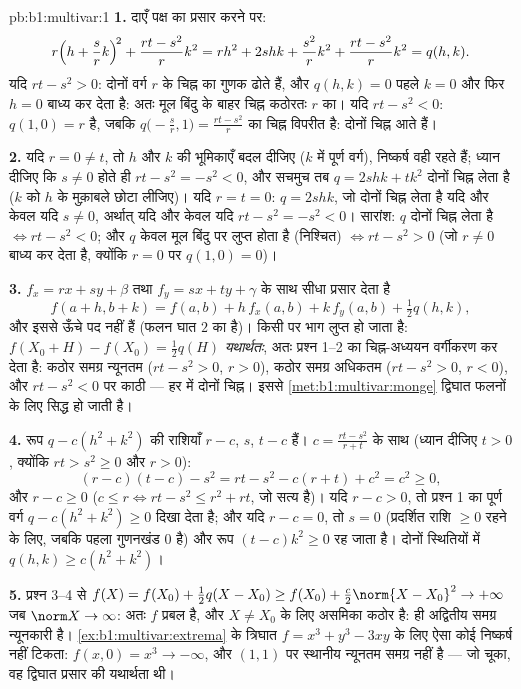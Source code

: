 \begin{solution}{pb:b1:multivar:1}
\textbf{1.} दाएँ पक्ष का प्रसार करने पर:
\[
r\Bigl(h + \frac srk\Bigr)^{\!2} + \frac{rt - s^2}{r}k^2
= rh^2 + 2shk + \frac{s^2}{r}k^2 + \frac{rt - s^2}{r}k^2
= q(h,k) .
\]
यदि $rt - s^2 > 0$: दोनों वर्ग $r$ के चिह्न का गुणक ढोते हैं, और $q(h,k)
= 0$ पहले $k = 0$ और फिर $h = 0$ बाध्य कर देता है: अतः मूल बिंदु के बाहर
चिह्न कठोरतः $r$ का। यदि $rt - s^2 < 0$: $q(1, 0) = r$ है, जबकि
$q\bigl(-\frac sr, 1\bigr) = \frac{rt - s^2}{r}$ का चिह्न विपरीत है: दोनों
चिह्न आते हैं।

\textbf{2.} यदि $r = 0 \neq t$, तो $h$ और $k$ की भूमिकाएँ बदल दीजिए ($k$
में पूर्ण वर्ग), निष्कर्ष वही रहते हैं; ध्यान दीजिए कि $s \neq 0$ होते ही
$rt - s^2 = -s^2 < 0$, और सचमुच तब $q = 2shk + tk^2$ दोनों चिह्न लेता है
($k$ को $h$ के मुक़ाबले छोटा लीजिए)। यदि $r = t = 0$: $q = 2shk$, जो दोनों
चिह्न लेता है यदि और केवल यदि $s \neq 0$, अर्थात् यदि और केवल यदि $rt -
s^2 = -s^2 < 0$। सारांश: $q$ दोनों चिह्न लेता है $\iff rt - s^2 < 0$; और
$q$ केवल मूल बिंदु पर लुप्त होता है (निश्चित) $\iff rt - s^2 > 0$ (जो $r
\neq 0$ बाध्य कर देता है, क्योंकि $r = 0$ पर $q(1,0) = 0$)।

\textbf{3.} $f_x = rx + sy + \beta$ तथा $f_y = sx + ty + \gamma$ के साथ
सीधा प्रसार देता है
\[
f(a + h, b + k) = f(a, b) + h\,f_x(a,b) + k\,f_y(a,b)
+ \tfrac12 q(h, k),
\]
और इससे ऊँचे पद नहीं हैं (फलन घात $2$ का  है)। किसी  पर
 भाग लुप्त हो जाता है: $f(X_0 + H) - f(X_0) = \frac12 q(H)$
\emph{यथार्थतः}, अतः प्रश्न 1--2 का चिह्न-अध्ययन वर्गीकरण कर देता है: कठोर
समग्र न्यूनतम ($rt - s^2 > 0$, $r > 0$), कठोर समग्र अधिकतम ($rt - s^2 >
0$, $r < 0$), और $rt - s^2 < 0$ पर काठी --- हर  में दोनों चिह्न।
इससे \cref{met:b1:multivar:monge} द्विघात फलनों के लिए सिद्ध हो जाती है।

\textbf{4.} रूप $q - c(h^2 + k^2)$ की राशियाँ $r - c$, $s$, $t - c$ हैं।
$c = \frac{rt - s^2}{r + t}$ के साथ (ध्यान दीजिए $t > 0$, क्योंकि $rt >
s^2 \geq 0$ और $r > 0$):
\[
(r - c)(t - c) - s^2 = rt - s^2 - c(r + t) + c^2 = c^2 \geq 0,
\]
और $r - c \geq 0$ ($c \leq r \iff rt - s^2 \leq r^2 + rt$, जो सत्य है)।
यदि $r - c > 0$, तो प्रश्न 1 का पूर्ण वर्ग $q - c(h^2 + k^2) \geq 0$ दिखा
देता है; और यदि $r - c = 0$, तो $s = 0$ (प्रदर्शित राशि $\geq 0$ रहने के
लिए, जबकि पहला गुणनखंड $0$ है) और रूप $(t - c)k^2 \geq 0$ रह जाता है।
दोनों स्थितियों में $q(h,k) \geq c(h^2 + k^2)$।

\textbf{5.} प्रश्न 3--4 से $f(X) = f(X_0) + \frac12 q(X - X_0) \geq f(X_0)
+ \frac c2\norm{X - X_0}^2 \to +\infty$ जब $\norm X \to \infty$: अतः $f$
प्रबल है, और $X \neq X_0$ के लिए असमिका कठोर है:  ही
अद्वितीय समग्र न्यूनकारी है। \cref{ex:b1:multivar:extrema} के त्रिघात $f =
x^3 + y^3 - 3xy$ के लिए ऐसा कोई निष्कर्ष नहीं टिकता: $f(x,0) = x^3 \to
-\infty$, और $(1,1)$ पर स्थानीय न्यूनतम समग्र नहीं है --- जो चूका, वह
द्विघात प्रसार की यथार्थता थी।


\end{solution}
